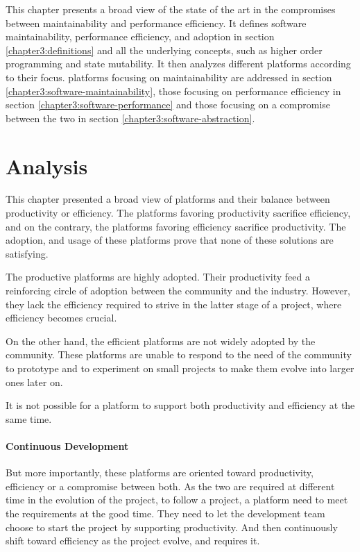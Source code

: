 This chapter presents a broad view of the state of the art in the compromises between maintainability and performance efficiency.
It defines software maintainability, performance efficiency, and adoption in section \ref{chapter3:definitions} and all the underlying concepts, such as higher order programming and state mutability.
It then analyzes different platforms according to their focus. platforms focusing on maintainability are addressed in section \ref{chapter3:software-maintainability}, those focusing on performance efficiency in section \ref{chapter3:software-performance} and those focusing on a compromise between the two in section \ref{chapter3:software-abstraction}.









\section{Analysis}

This chapter presented a broad view of platforms and their balance between productivity or efficiency.
The platforms favoring productivity sacrifice efficiency, and on the contrary, the platforms favoring efficiency sacrifice productivity.
The adoption, and usage of these platforms prove that none of these solutions are satisfying.

The productive platforms are highly adopted.
Their productivity feed a reinforcing circle of adoption between the community and the industry.
However, they lack the efficiency required to strive in the latter stage of a project, where efficiency becomes crucial.

On the other hand, the efficient platforms are not widely adopted by the community.
These platforms are unable to respond to the need of the community to prototype and to experiment on small projects to make them evolve into larger ones later on.

It is not possible for a platform to support both productivity and efficiency at the same time.

\paragraph{Continuous Development}

But more importantly, these platforms are oriented toward productivity, efficiency or a compromise between both.
As the two are required at different time in the evolution of the project, to follow a project, a platform need to meet the requirements at the good time.
They need to let the development team choose to start the project by supporting productivity.
And then continuously shift toward efficiency as the project evolve, and requires it.

